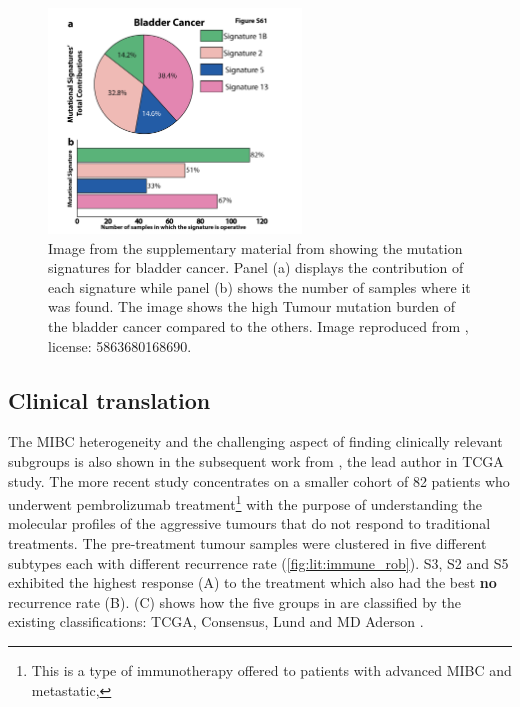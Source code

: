 \begin{figure}[!htb]    
    \centering
    \includegraphics[width=0.6\textwidth,height=0.6\textheight,keepaspectratio]{Sections/Lit_review/Resources/bladder_mut_sig.png}
    \caption[Bladder mutational signature]{Image from the supplementary material from \citeauthor{Alexandrov2013-gi} showing the mutation signatures for bladder cancer. Panel (a) displays the contribution of each signature while panel (b) shows the number of samples where it was found. The image shows the high Tumour mutation burden of the bladder cancer compared to the others. Image reproduced from \citep{Alexandrov2013-gi}, license: 5863680168690. }
    \label{fig:lit:bladder_mut_sig}
\end{figure}



\subsection{Clinical translation} \label{s:lit:clinical}


The MIBC heterogeneity and the challenging aspect of finding clinically relevant subgroups is also shown in the subsequent work from \citeauthor{Robertson2023-na}, the lead author in TCGA study. The more recent study concentrates on a smaller cohort of 82 patients who underwent pembrolizumab treatment\footnote{This is a type of immunotherapy offered to patients with advanced MIBC and metastatic,} with the purpose of understanding the molecular profiles of the aggressive tumours that do not respond to traditional treatments. The pre-treatment tumour samples were clustered in five different subtypes each with different recurrence rate (\cref{fig:lit:immune_rob}). S3, S2 and S5 exhibited the highest response (A) to the treatment which also had the best \textbf{no} recurrence rate (B).  (C) shows how the five groups in \cite{Robertson2023-na} are classified by the existing classifications: TCGA, Consensus, Lund and MD Aderson \citep{Robertson2017-mg,Kamoun2020-tj,Marzouka2018-ge,Dadhania2016-cb}. 

